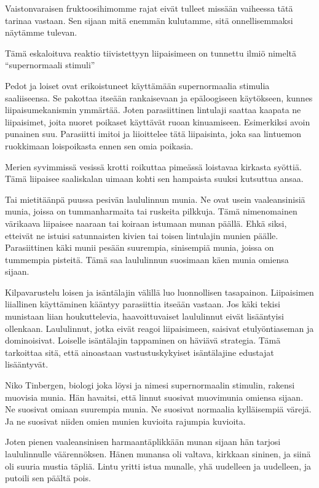 Vaistonvaraisen fruktoosihimomme rajat eivät tulleet missään vaiheessa tätä tarinaa vastaan. Sen sijaan mitä enemmän kulutamme, sitä onnellisemmaksi näytämme tulevan.

Tämä eskaloituva reaktio tiivistettyyn liipaisimeen on tunnettu ilmiö nimeltä ``supernormaali stimuli''

Pedot ja loiset ovat erikoistuneet käyttämään supernormaalia stimulia saaliiseensa. Se pakottaa itseään rankaisevaan ja epäloogiseen käytökseen, kunnes liipaisumekanismin ymmärtää. Joten parasiittinen lintulaji saattaa kaapata ne liipaisimet, joita nuoret poikaset käyttävät ruoan kinuamiseen. Esimerkiksi avoin punainen suu. Parasiitti imitoi ja liioittelee tätä liipaisinta, joka saa lintuemon ruokkimaan loispoikasta ennen sen omia poikasia.

Merien syvimmissä vesissä krotti roikuttaa pimeässä loistavaa kirkasta syöttiä. Tämä liipaisee saaliskalan uimaan kohti sen hampaista suuksi kutsuttua ansaa.

Tai mietitäänpä puussa pesivän laululinnun munia. Ne ovat usein vaaleansinisiä munia, joissa on tummanharmaita tai ruskeita pilkkuja. Tämä nimenomainen värikaava liipaisee naaraan tai koiraan istumaan munan päällä. Ehkä siksi, etteivät ne istuisi satunnaisten kivien tai toisen lintulajin munien päälle. Parasiittinen käki munii pesään suurempia, sinisempiä munia, joissa on tummempia pisteitä. Tämä saa laululinnun suosimaan käen munia omiensa sijaan.

Kilpavarustelu loisen ja isäntälajin välillä luo luonnollisen tasapainon. Liipaisimen liiallinen käyttäminen kääntyy parasiittia itseään vastaan. Jos käki tekisi munistaan liian houkuttelevia, haavoittuvaiset laululinnut eivät lisääntyisi ollenkaan. Laululinnut, jotka eivät reagoi liipaisimeen, saisivat etulyöntiaseman ja dominoisivat. Loiselle isäntälajin tappaminen on häviävä strategia. Tämä tarkoittaa sitä, että ainoastaan vastustuskykyiset isäntälajine edustajat lisääntyvät.

Niko Tinbergen, biologi joka löysi ja nimesi supernormaalin stimulin, rakensi muovisia munia. Hän havaitsi, että linnut suosivat muovimunia omiensa sijaan. Ne suosivat omiaan suurempia munia. Ne suosivat normaalia kylläisempiä värejä. Ja ne suosivat niiden omien munien kuvioita rajumpia kuvioita.

Joten pienen vaaleansinisen harmaantäplikkään munan sijaan hän tarjosi laululinnulle väärennöksen. Hänen munansa oli valtava, kirkkaan sininen, ja siinä oli suuria mustia täpliä. Lintu yritti istua munalle, yhä uudelleen ja uudelleen, ja putoili sen päältä pois.

